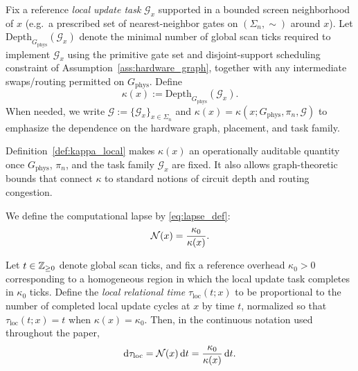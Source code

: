 \begin{definition}
\label{def:kappa_local}
Fix a reference \emph{local update task} $\mathcal{G}_x$ supported in a bounded screen neighborhood of $x$ (e.g.\ a prescribed set of nearest-neighbor gates on $(\Sigma_n,\sim)$ around $x$).
Let $\mathrm{Depth}_{G_{\mathrm{phys}}}(\mathcal{G}_x)$ denote the minimal number of global scan ticks required to implement $\mathcal{G}_x$ using the primitive gate set and disjoint-support scheduling constraint of Assumption~\ref{ass:hardware_graph}, together with any intermediate swaps/routing permitted on $G_{\mathrm{phys}}$.
Define
\[
\kappa(x):=\mathrm{Depth}_{G_{\mathrm{phys}}}(\mathcal{G}_x).
\]
When needed, we write $\mathcal{G}:=\{\mathcal{G}_x\}_{x\in\Sigma_n}$ and $\kappa(x)=\kappa(x;G_{\mathrm{phys}},\pi_n,\mathcal{G})$ to emphasize the dependence on the hardware graph, placement, and task family.
\end{definition}

Definition~\ref{def:kappa_local} makes $\kappa(x)$ an operationally auditable quantity once $G_{\mathrm{phys}}$, $\pi_n$, and the task family $\mathcal{G}_x$ are fixed.
It also allows graph-theoretic bounds that connect $\kappa$ to standard notions of circuit depth and routing congestion.

We define the computational lapse by \eqref{eq:lapse_def}:
\[
\mathcal{N}(x)=\frac{\kappa_0}{\kappa(x)}.
\]

\begin{proposition}
\label{prop:proper_time_scaling}
Let $t\in\mathbb{Z}_{\ge 0}$ denote global scan ticks, and fix a reference overhead $\kappa_0>0$ corresponding to a homogeneous region in which the local update task completes in $\kappa_0$ ticks.
Define the \emph{local relational time} $\tau_{\mathrm{loc}}(t;x)$ to be proportional to the number of completed local update cycles at $x$ by time $t$, normalized so that $\tau_{\mathrm{loc}}(t;x)=t$ when $\kappa(x)=\kappa_0$.
Then, in the continuous notation used throughout the paper,
\begin{equation}
\label{eq:proper_time_scaling}
\mathrm{d} \tau_{\mathrm{loc}}=\mathcal{N}(x)\,\mathrm{d} t=\frac{\kappa_0}{\kappa(x)}\,\mathrm{d} t.
\end{equation}
\end{proposition}

